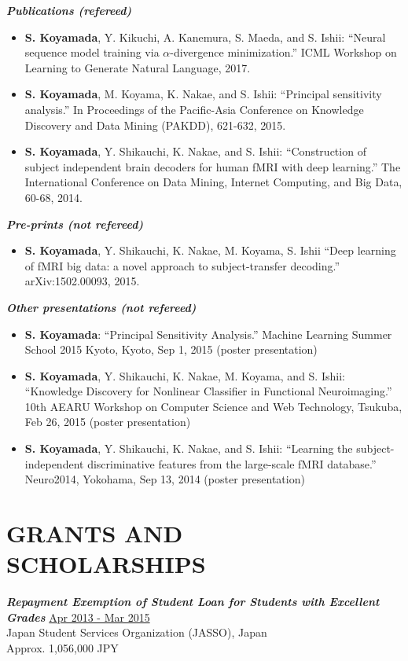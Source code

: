 \documentclass[margin, 10pt]{res} %
\begin{document}
\begin{resume}
{\sl {\bf Publications (refereed)}} \vspace{0.5em}
\begin{itemize}
\item {\bf S. Koyamada}, Y. Kikuchi, A. Kanemura, S. Maeda, and S. Ishii: ``Neural sequence model training via $\alpha$-divergence minimization.'' ICML Workshop on Learning to Generate Natural Language, 2017.
\item {\bf S. Koyamada}, M. Koyama, K. Nakae, and S. Ishii: ``Principal sensitivity analysis.'' In Proceedings of the Pacific-Asia Conference on Knowledge Discovery and Data Mining (PAKDD), 621-632, 2015.
\item {\bf S. Koyamada}, Y. Shikauchi, K. Nakae, and S. Ishii: ``Construction of subject independent brain decoders for human fMRI with deep learning.'' The International Conference on Data Mining, Internet Computing, and Big Data, 60-68, 2014.
\end{itemize}

{\sl {\bf Pre-prints (not refereed)}} \vspace{0.5em}
\begin{itemize}
\item {\bf S. Koyamada}, Y. Shikauchi, K. Nakae, M. Koyama, S. Ishii ``Deep learning of fMRI big data: a novel approach to subject-transfer decoding.'' arXiv:1502.00093, 2015.
\end{itemize}

{\sl {\bf Other presentations (not refereed)}} \vspace{0.5em}
\begin{itemize}
\item {\bf S. Koyamada}: ``Principal Sensitivity Analysis.'' Machine Learning Summer School 2015 Kyoto, Kyoto, Sep 1, 2015 (poster presentation)
\item {\bf S. Koyamada}, Y. Shikauchi, K. Nakae, M. Koyama, and S. Ishii: ``Knowledge Discovery for Nonlinear Classifier in Functional Neuroimaging.'' 10th AEARU Workshop on Computer Science and Web Technology, Tsukuba, Feb 26, 2015 (poster presentation)
\item {\bf S. Koyamada}, Y. Shikauchi, K. Nakae, and S. Ishii: ``Learning the subject-independent discriminative features from the large-scale fMRI database.'' Neuro2014, Yokohama, Sep 13, 2014 (poster presentation)
\end{itemize}

\section{{\small GRANTS AND\\SCHOLARSHIPS}}
{\sl {\bf Repayment Exemption of Student Loan for Students with Excellent Grades}} \hfill {\small \underline{Apr 2013 - Mar 2015}} \\
Japan Student Services Organization (JASSO), Japan \\
Approx. 1,056,000 JPY


\end{resume}
\end{document}
